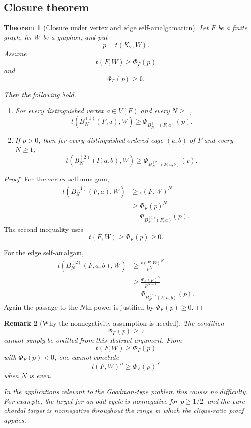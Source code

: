 \documentclass[11pt]{article}
\newtheorem{theorem}{Theorem}
\newtheorem{remark}[theorem]{Remark}
\begin{document}
\subsection{Closure theorem}

\begin{theorem}[Closure under vertex and edge self-amalgamation]
Let $F$ be a finite graph, let $W$ be a graphon, and put
\[
    p=t(K_2,W).
\]
Assume
\[
    t(F,W)\ge \Phi_F(p)
\]
and
\[
    \Phi_F(p)\ge0.
\]

Then the following hold.

\begin{enumerate}
    \item
    For every distinguished vertex $a\in V(F)$ and every $N\ge1$,
    \[
        t(B_N^{(1)}(F,a),W)
        \ge
        \Phi_{B_N^{(1)}(F,a)}(p).
    \]

    \item
    If $p>0$, then for every distinguished ordered edge
    $(a,b)$ of $F$ and every $N\ge1$,
    \[
        t(B_N^{(2)}(F,a,b),W)
        \ge
        \Phi_{B_N^{(2)}(F,a,b)}(p).
    \]
\end{enumerate}
\end{theorem}

\begin{proof}
For the vertex self-amalgam,
\[
\begin{aligned}
    t(B_N^{(1)}(F,a),W)
    &\ge
    t(F,W)^N
    \\
    &\ge
    \Phi_F(p)^N
    \\
    &=
    \Phi_{B_N^{(1)}(F,a)}(p).
\end{aligned}
\]
The second inequality uses
\[
    t(F,W)\ge\Phi_F(p)\ge0.
\]

For the edge self-amalgam,
\[
\begin{aligned}
    t(B_N^{(2)}(F,a,b),W)
    &\ge
    \frac{t(F,W)^N}{p^{N-1}}
    \\
    &\ge
    \frac{\Phi_F(p)^N}{p^{N-1}}
    \\
    &=
    \Phi_{B_N^{(2)}(F,a,b)}(p).
\end{aligned}
\]
Again the passage to the $N$th power is justified by
$\Phi_F(p)\ge0$.
\end{proof}

\begin{remark}[Why the nonnegativity assumption is needed]
The condition
\[
    \Phi_F(p)\ge0
\]
cannot simply be omitted from this abstract argument. From
\[
    t(F,W)\ge\Phi_F(p)
\]
with $\Phi_F(p)<0$, one cannot conclude
\[
    t(F,W)^N\ge\Phi_F(p)^N
\]
when $N$ is even.

In the applications relevant to the Goodman-type problem this causes
no difficulty. For example, the target for an odd cycle is nonnegative
for $p\ge1/2$, and the pure-chordal target is nonnegative throughout
the range in which the clique-ratio proof applies.
\end{remark}
\end{document}
